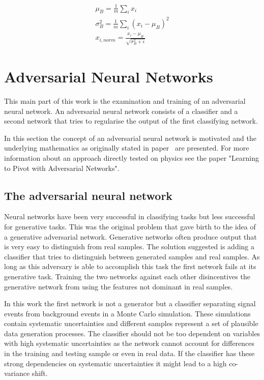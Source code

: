\begin{align}
    \mu_B = \frac{1}{m} \sum_i x_i\\
    \sigma_B^2 = \frac{1}{m} \sum_i (x_i - \mu_B)^2\\
    x_{i,norm} = \frac{x_i - \mu_B}{\sqrt{\sigma_B^2 + \epsilon}}
\end{align}





\section{Adversarial Neural Networks}

This main part of this work is the examination and training of an adversarial neural network. An adversarial neural network consists of a classifier and a second network that tries to regularise the output of the first classifying network.

In this section the concept of an adversarial neural network is motivated and the underlying mathematics as originally stated in paper~\cite{2014arXiv1406.2661G} are presented.
For more information about an approach directly tested on physics see the paper "Learning to Pivot with Adversarial Networks".~\cite{Louppe:2016ylz}

\subsection{The adversarial neural network}

Neural networks have been very successful in classifying tasks but less successful for generative tasks. This was the original problem that gave birth to the idea of a generative adversarial network. Generative networks often produce output that is very easy to distinguish from real samples. The solution suggested is adding a classifier that tries to distinguish between generated samples and real samples. As long as this adversary is able to accomplish this task the first network fails at its generative task. Training the two networks against each other disincentives the generative network from using the features not dominant in real samples.

In this work the first network is not a generator but a classifier separating signal events from background events in a Monte Carlo simulation. These simulations contain systematic uncertainties and different samples represent a set of plausible data generation processes. The classifier should not be too dependent on variables with high systematic uncertainties as the network cannot account for differences in the training and testing sample or even in real data. If the classifier has these strong dependencies on systematic uncertainties it might lead to a high co-variance shift.

